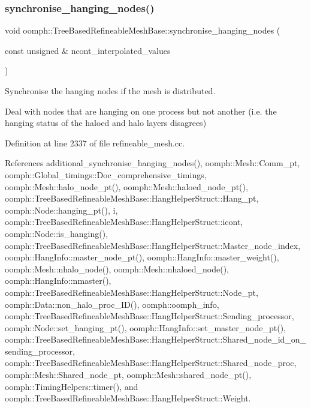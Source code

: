 \subsubsection{\texorpdfstring{synchronise\+\_\+hanging\+\_\+nodes()}{synchronise\_hanging\_nodes()}}
{\footnotesize\ttfamily void oomph\+::\+Tree\+Based\+Refineable\+Mesh\+Base\+::synchronise\+\_\+hanging\+\_\+nodes (\begin{DoxyParamCaption}\item[{const unsigned \&}]{ncont\+\_\+interpolated\+\_\+values }\end{DoxyParamCaption})\hspace{0.3cm}{\ttfamily [protected]}}



Synchronise the hanging nodes if the mesh is distributed. 

Deal with nodes that are hanging on one process but not another (i.\+e. the hanging status of the haloed and halo layers disagrees) 

Definition at line 2337 of file refineable\+\_\+mesh.\+cc.



References additional\+\_\+synchronise\+\_\+hanging\+\_\+nodes(), oomph\+::\+Mesh\+::\+Comm\+\_\+pt, oomph\+::\+Global\+\_\+timings\+::\+Doc\+\_\+comprehensive\+\_\+timings, oomph\+::\+Mesh\+::halo\+\_\+node\+\_\+pt(), oomph\+::\+Mesh\+::haloed\+\_\+node\+\_\+pt(), oomph\+::\+Tree\+Based\+Refineable\+Mesh\+Base\+::\+Hang\+Helper\+Struct\+::\+Hang\+\_\+pt, oomph\+::\+Node\+::hanging\+\_\+pt(), i, oomph\+::\+Tree\+Based\+Refineable\+Mesh\+Base\+::\+Hang\+Helper\+Struct\+::icont, oomph\+::\+Node\+::is\+\_\+hanging(), oomph\+::\+Tree\+Based\+Refineable\+Mesh\+Base\+::\+Hang\+Helper\+Struct\+::\+Master\+\_\+node\+\_\+index, oomph\+::\+Hang\+Info\+::master\+\_\+node\+\_\+pt(), oomph\+::\+Hang\+Info\+::master\+\_\+weight(), oomph\+::\+Mesh\+::nhalo\+\_\+node(), oomph\+::\+Mesh\+::nhaloed\+\_\+node(), oomph\+::\+Hang\+Info\+::nmaster(), oomph\+::\+Tree\+Based\+Refineable\+Mesh\+Base\+::\+Hang\+Helper\+Struct\+::\+Node\+\_\+pt, oomph\+::\+Data\+::non\+\_\+halo\+\_\+proc\+\_\+\+I\+D(), oomph\+::oomph\+\_\+info, oomph\+::\+Tree\+Based\+Refineable\+Mesh\+Base\+::\+Hang\+Helper\+Struct\+::\+Sending\+\_\+processor, oomph\+::\+Node\+::set\+\_\+hanging\+\_\+pt(), oomph\+::\+Hang\+Info\+::set\+\_\+master\+\_\+node\+\_\+pt(), oomph\+::\+Tree\+Based\+Refineable\+Mesh\+Base\+::\+Hang\+Helper\+Struct\+::\+Shared\+\_\+node\+\_\+id\+\_\+on\+\_\+sending\+\_\+processor, oomph\+::\+Tree\+Based\+Refineable\+Mesh\+Base\+::\+Hang\+Helper\+Struct\+::\+Shared\+\_\+node\+\_\+proc, oomph\+::\+Mesh\+::\+Shared\+\_\+node\+\_\+pt, oomph\+::\+Mesh\+::shared\+\_\+node\+\_\+pt(), oomph\+::\+Timing\+Helpers\+::timer(), and oomph\+::\+Tree\+Based\+Refineable\+Mesh\+Base\+::\+Hang\+Helper\+Struct\+::\+Weight.



